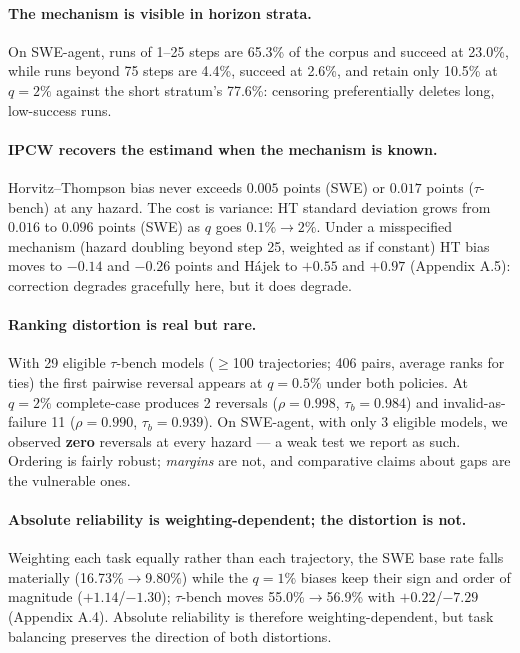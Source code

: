 \documentclass[letterpaper]{article}
\begin{document}
\paragraph{The mechanism is visible in horizon strata.} On SWE-agent, runs of
1--25 steps are 65.3\% of the corpus and succeed at 23.0\%, while runs beyond 75
steps are 4.4\%, succeed at 2.6\%, and retain only 10.5\% at $q=2\%$ against the
short stratum's 77.6\%: censoring preferentially deletes long, low-success runs.

\paragraph{IPCW recovers the estimand when the mechanism is known.}
Horvitz--Thompson bias never exceeds $0.005$ points (SWE) or $0.017$ points
($\tau$-bench) at any hazard. The cost is variance: HT standard deviation grows
from $0.016$ to $0.096$ points (SWE) as $q$ goes $0.1\%\!\to\!2\%$. Under a
misspecified mechanism (hazard doubling beyond step 25, weighted as if
constant) HT bias moves to $-0.14$ and $-0.26$ points and H\'ajek to $+0.55$
and $+0.97$ (Appendix A.5): correction degrades gracefully here, but it does
degrade.

\paragraph{Ranking distortion is real but rare.}
With 29 eligible $\tau$-bench models ($\geq$100 trajectories; 406 pairs, average
ranks for ties) the first pairwise reversal appears at $q=0.5\%$ under both
policies. At $q=2\%$ complete-case produces 2 reversals ($\rho=0.998$,
$\tau_b=0.984$) and invalid-as-failure 11 ($\rho=0.990$, $\tau_b=0.939$). On
SWE-agent, with only 3 eligible models, we observed \textbf{zero} reversals at
every hazard --- a weak test we report as such. Ordering is fairly robust;
\emph{margins} are not, and comparative claims about gaps are the vulnerable
ones.

\paragraph{Absolute reliability is weighting-dependent; the distortion is not.}
Weighting each task equally rather than each trajectory, the SWE base rate falls
materially (16.73\%$\to$9.80\%) while the $q=1\%$ biases keep their sign and
order of magnitude ($+1.14$/$-1.30$); $\tau$-bench moves 55.0\%$\to$56.9\% with
$+0.22$/$-7.29$ (Appendix A.4). Absolute reliability is therefore
weighting-dependent, but task balancing preserves the direction of both
distortions.
\end{document}

